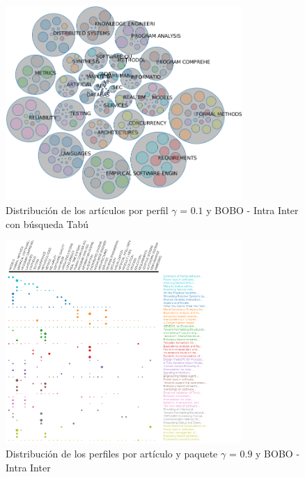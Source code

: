 \begin{figure}[H]
  \centering
    \includegraphics[width=0.8\textwidth]{resultados/papers/BOBO/INTRA_INTER/bubbles-gamma-with-local-01.png}
  \caption{Distribución de los artículos por perfil $\gamma$ = $0.1$ y BOBO - Intra Inter con búsqueda Tabú}
  \label{res:img-papers-bubbles-gamma01-hac-intra-inter-bobo}
\end{figure}

\begin{figure}[H]
  \centering
    \includegraphics[width=0.8\textwidth]{resultados/papers/BOBO/INTRA_INTER/gamma-09.png}
  \caption{Distribución de los perfiles por artículo y paquete $\gamma$ = $0.9$ y BOBO - Intra Inter}
  \label{res:img-papers-gamma09-bobo-intra-inter}
\end{figure}

